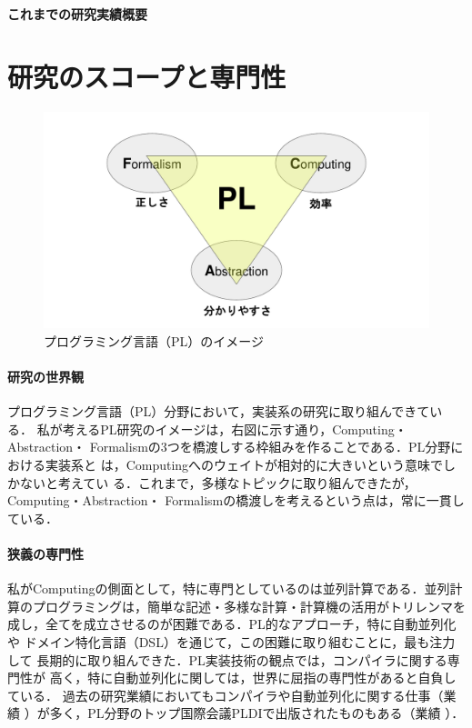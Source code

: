 \documentclass[dvipdfmx]{jsarticle}
\begin{document}
\begin{center}
\LARGE\bfseries これまでの研究実績概要
\end{center}

\section*{研究のスコープと専門性}

\begin{figure}
 \centering
 \includegraphics[width=\linewidth,trim=120 20 120 40]{PL-overview.pdf}
 \caption{プログラミング言語（PL）のイメージ}\label{fig:PL-overview}
\end{figure}
\paragraph{研究の世界観}
プログラミング言語（PL）分野において，実装系の研究に取り組んできている．
私が考えるPL研究のイメージは，右図に示す通り，Computing・Abstraction・
Formalismの3つを橋渡しする枠組みを作ることである．PL分野における実装系と
は，Computingへのウェイトが相対的に大きいという意味でしかないと考えてい
る．これまで，多様なトピックに取り組んできたが，Computing・Abstraction・
Formalismの橋渡しを考えるという点は，常に一貫している．

\paragraph{狭義の専門性}
私がComputingの側面として，特に専門としているのは並列計算である．並列計
算のプログラミングは，簡単な記述・多様な計算・計算機の活用がトリレンマを
成し，全てを成立させるのが困難である．PL的なアプローチ，特に自動並列化や
ドメイン特化言語（DSL）を通じて，この困難に取り組むことに，最も注力して
長期的に取り組んできた．PL実装技術の観点では，コンパイラに関する専門性が
高く，特に自動並列化に関しては，世界に屈指の専門性があると自負している．
過去の研究業績においてもコンパイラや自動並列化に関する仕事（業績
\cite{pldi21:red_par,ipdps21:plex,jip20:centaurus,splash19:nbody,adbis18:par_xpath,jip17:hadoop,aplas14:sd_dfa,pro13:tree_par,pldi11:red_par,aplas09:gpgpu_skel}
）が多く，PL分野のトップ国際会議PLDIで出版されたものもある（業績
\cite{pldi21:red_par,pldi11:red_par}）．
\end{document}
